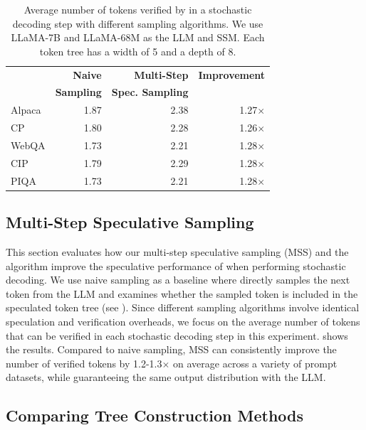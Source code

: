 \begin{table}[t]
\begin{center}
\caption{Average number of tokens verified by \SpecInfer in a stochastic decoding step with different sampling algorithms. We use LLaMA-7B and LLaMA-68M as the LLM and SSM. Each token tree has a width of 5 and a depth of 8.}
\label{specinfer:tab:eval_msss}
\begin{tabular}{l|rrr}
\toprule
& {\bf Naive}  & {\bf Multi-Step} & {\bf Improvement} \\
& {\bf Sampling} & {\bf Spec. Sampling} & \\ \midrule
Alpaca     & 1.87     & 2.38    & 1.27$\times$\\
CP         & 1.80     & 2.28    & 1.26$\times$\\
WebQA      & 1.73     & 2.21    & 1.28$\times$\\
CIP        & 1.79     & 2.29    & 1.28$\times$\\
PIQA       & 1.73     & 2.21    & 1.28$\times$\\
\bottomrule
\end{tabular}
\end{center}
\end{table}

\subsection{Multi-Step Speculative Sampling}
\label{specinfer:subsec:eval_msss}

This section evaluates how our multi-step speculative sampling (MSS) and the  algorithm improve the speculative performance of \SpecInfer when performing stochastic decoding.
We use naive sampling as a baseline where \SpecInfer directly samples the next token from the LLM and examines whether the sampled token is included in the speculated token tree (see ).
Since different sampling algorithms involve identical speculation and verification overheads, we focus on the average number of tokens that can be verified in each stochastic decoding step in this experiment.
 shows the results. Compared to naive sampling, MSS can consistently improve the number of verified tokens by 1.2-1.3$\times$ on average across a variety of prompt datasets, while guaranteeing the same output distribution with the LLM.

\subsection{Comparing Tree Construction Methods}
\label{specinfer:sec:eval_tree_construction_methods}

